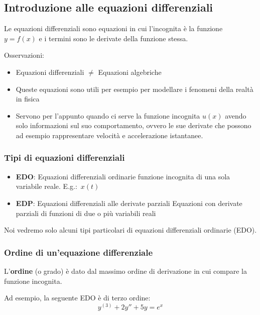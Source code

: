 \subsection{Introduzione alle equazioni differenziali}

Le equazioni differenziali sono equazioni in cui l'incognita è la funzione \(y = f(x)\) e i termini sono le derivate della funzione stessa.

Osservazioni:
\begin{itemize}
    \item Equazioni differenziali \(\neq{}\) Equazioni algebriche
    \item Queste equazioni sono utili per esempio per modellare i fenomeni della realtà in fisica
    \item Servono per l'appunto quando ci serve la funzione incognita \(u(x)\) avendo solo informazioni sul suo comportamento, ovvero le sue derivate che possono ad esempio rappresentare velocità e accelerazione istantanee.
\end{itemize}

\subsubsection{Tipi di equazioni differenziali}

\begin{itemize}
    \item \textbf{EDO}: Equazioni differenziali ordinarie\newline
          funzione incognita di una sola variabile reale. E.g.:\  \(x(t)\)
    \item \textbf{EDP}: Equazioni differenziali alle derivate parziali\newline
          Equazioni con derivate parziali di funzioni di due o più variabili reali
\end{itemize}

Noi vedremo solo alcuni tipi particolari di equazioni differenziali ordinarie (EDO).

\subsubsection{Ordine di un'equazione differenziale}

L'\textbf{ordine} (o grado) è dato dal massimo ordine di derivazione in cui compare la funzione incognita.

Ad esempio, la seguente EDO è di terzo ordine:
\[
    y^{(3)}+2y''+5y = e^x
\]

